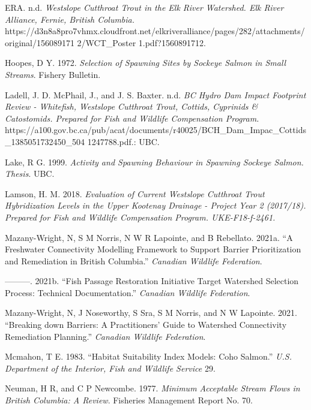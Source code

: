 \documentclass[
  letterpaper,
  DIV=11,
  numbers=noendperiod]{scrreprt}
\newlength{\cslhangindent}
\newenvironment{CSLReferences}[2] %
 {\begin{list}{}{%
  \setlength{\itemindent}{0pt}
  \setlength{\leftmargin}{0pt}
  \setlength{\parsep}{0pt}
  \ifodd #1
   \setlength{\leftmargin}{\cslhangindent}
   \setlength{\itemindent}{-1\cslhangindent}
  \fi
  \setlength{\itemsep}{#2\baselineskip}}}
 {\end{list}}
\begin{document}
\begin{CSLReferences}{1}{0}
ERA. n.d. \emph{Westslope Cutthroat Trout in the Elk River Watershed.
Elk River Alliance, Fernie, British Columbia.}
https://d3n8a8pro7vhmx.cloudfront.net/elkriveralliance/pages/282/attachments/original/156089171
2/WCT\_Poster 1.pdf?1560891712.

Hoopes, D Y. 1972. \emph{Selection of Spawning Sites by Sockeye Salmon
in Small Streams}. Fishery Bulletin.

Ladell, J. D. McPhail, J., and J. S. Baxter. n.d.\emph{ BC Hydro Dam
Impact Footprint Review - Whitefish, Westslope Cutthroat Trout, Cottids,
Cyprinids \& Catostomids. Prepared for Fish and Wildlife Compensation
Program.}
https://a100.gov.bc.ca/pub/acat/documents/r40025/BCH\_Dam\_Impac\_Cottids\_1385051732450\_504
1247788.pdf.: UBC.

Lake, R G. 1999. \emph{Activity and Spawning Behaviour in Spawning
Sockeye Salmon. Thesis}. UBC.

Lamson, H. M. 2018. \emph{Evaluation of Current Westslope Cutthroat
Trout Hybridization Levels in the Upper Kootenay Drainage - Project Year
2 (2017/18). Prepared for Fish and Wildlife Compensation Program.
UKE-F18-f-2461.}

Mazany-Wright, N, S M Norris, N W R Lapointe, and B Rebellato. 2021a.
{``A Freshwater Connectivity Modelling Framework to Support Barrier
Prioritization and Remediation in British Columbia.''} \emph{Canadian
Wildlife Federation}.

---------. 2021b. {``Fish Passage Restoration Initiative Target
Watershed Selection Process: Technical Documentation.''} \emph{Canadian
Wildlife Federation}.

Mazany-Wright, N, J Noseworthy, S Sra, S M Norris, and N W Lapointe.
2021. {``Breaking down Barriers: A Practitioners' Guide to Watershed
Connectivity Remediation Planning.''} \emph{Canadian Wildlife
Federation}.

Mcmahon, T E. 1983. {``Habitat Suitability Index Models: Coho Salmon.''}
\emph{{U.S}. Department of the Interior, Fish and Wildlife Service} 29.

Neuman, H R, and C P Newcombe. 1977. \emph{Minimum Acceptable Stream
Flows in British Columbia: A Review}. Fisheries Management Report No.
70.


\end{CSLReferences}
\end{document}
